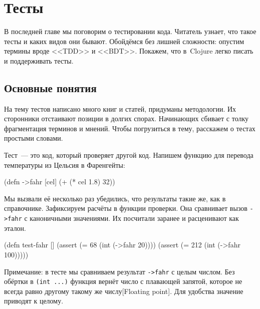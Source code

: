 \chapter{Тесты}


\label{chapter-tests}

\begin{teaser}
В последней главе мы поговорим о тестировании кода. Читатель узнает, что такое
тесты и каких видов они бывают. Обойдёмся без лишней сложности: опустим
термины вроде <<TDD>> и <<BDT>>. Покажем, что в~Clojure легко писать и
поддерживать тесты.
\end{teaser}

\section{Основные понятия}

На тему тестов написано много книг и статей, придуманы методологии. Их
сторонники отстаивают позиции в долгих спорах. Начинающих сбивает с толку
фрагментация терминов и мнений. Чтобы погрузиться в тему, расскажем о тестах
простыми словами.


Тест~--- это код, который проверяет другой код. Напишем функцию для перевода
температуры из Цельсия в Фаренгейты:

\begin{english}
  \begin{clojure}
(defn ->fahr [cel]
  (+ (* cel 1.8) 32))
  \end{clojure}
\end{english}


Мы вызвали её несколько раз убедились, что результаты такие же, как в
справочнике. Зафиксируем расчёты в функции проверки. Она сравнивает вызов
\verb|->fahr| с каноничными значениями. Их посчитали заранее и расценивают как
эталон.

\begin{english}
  \begin{clojure}
(defn test-fahr []
  (assert (=  68 (int (->fahr 20))))
  (assert (= 212 (int (->fahr 100)))))
  \end{clojure}
\end{english}


Примечание: в тесте мы сравниваем результат \verb|->fahr| с целым числом. Без
обёртки в \verb|(int ...)| функция вернёт число с плавающей запятой, которое не
всегда равно другому такому же числу[Floating point].
Для удобства значение приводят к целому.

